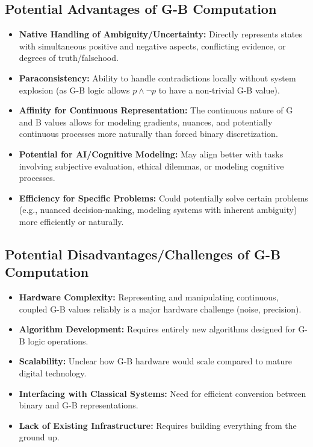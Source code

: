 \documentclass{article}
\begin{document}
\subsection{Potential Advantages of G-B Computation}
\begin{itemize}
    \item \textbf{Native Handling of Ambiguity/Uncertainty:} Directly represents states with simultaneous positive and negative aspects, conflicting evidence, or degrees of truth/falsehood.
    \item \textbf{Paraconsistency:} Ability to handle contradictions locally without system explosion (as G-B logic allows $p \land \neg p$ to have a non-trivial G-B value).
    \item \textbf{Affinity for Continuous Representation:} The continuous nature of G and B values allows for modeling gradients, nuances, and potentially continuous processes more naturally than forced binary discretization.
    \item \textbf{Potential for AI/Cognitive Modeling:} May align better with tasks involving subjective evaluation, ethical dilemmas, or modeling cognitive processes.
    \item \textbf{Efficiency for Specific Problems:} Could potentially solve certain problems (e.g., nuanced decision-making, modeling systems with inherent ambiguity) more efficiently or naturally.
\end{itemize}

\subsection{Potential Disadvantages/Challenges of G-B Computation}
\begin{itemize}
    \item \textbf{Hardware Complexity:} Representing and manipulating continuous, coupled G-B values reliably is a major hardware challenge (noise, precision).
    \item \textbf{Algorithm Development:} Requires entirely new algorithms designed for G-B logic operations.
    \item \textbf{Scalability:} Unclear how G-B hardware would scale compared to mature digital technology.
    \item \textbf{Interfacing with Classical Systems:} Need for efficient conversion between binary and G-B representations.
    \item \textbf{Lack of Existing Infrastructure:} Requires building everything from the ground up.
\end{itemize}
\end{document}
